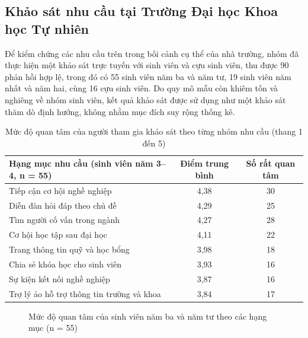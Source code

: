 \documentclass[12pt,a4paper,oneside]{report}
\begin{document}
\subsection{Khảo sát nhu cầu tại Trường Đại học Khoa học Tự nhiên}

Để kiểm chứng các nhu cầu trên trong bối cảnh cụ thể của nhà trường, nhóm đã thực hiện một khảo sát trực tuyến với sinh viên và cựu sinh viên, thu được 90 phản hồi hợp lệ, trong đó có 55 sinh viên năm ba và năm tư, 19 sinh viên năm nhất và năm hai, cùng 16 cựu sinh viên. Do quy mô mẫu còn khiêm tốn và nghiêng về nhóm sinh viên, kết quả khảo sát được sử dụng như một khảo sát thăm dò định hướng, không nhằm mục đích suy rộng thống kê.

\renewcommand{\arraystretch}{1.25}
\begin{table}[H]
\centering
\small
\caption{Mức độ quan tâm của người tham gia khảo sát theo từng nhóm nhu cầu (thang 1 đến 5)}
\label{tab:survey}
\begin{tabular}{|>{\raggedright\arraybackslash}p{7.4cm}|c|c|}
\hline
\textbf{Hạng mục nhu cầu (sinh viên năm 3--4, n = 55)} & \textbf{Điểm trung bình} & \textbf{Số rất quan tâm} \\ \hline
Tiếp cận cơ hội nghề nghiệp & 4,38 & 30 \\ \hline
Diễn đàn hỏi đáp theo chủ đề & 4,29 & 25 \\ \hline
Tìm người cố vấn trong ngành & 4,27 & 28 \\ \hline
Cơ hội học tập sau đại học & 4,11 & 22 \\ \hline
Trang thông tin quỹ và học bổng & 3,98 & 18 \\ \hline
Chia sẻ khóa học cho sinh viên & 3,93 & 16 \\ \hline
Sự kiện kết nối nghề nghiệp & 3,87 & 16 \\ \hline
Trợ lý ảo hỗ trợ thông tin trường và khoa & 3,84 & 17 \\ \hline
\end{tabular}
\end{table}
\renewcommand{\arraystretch}{1}

\begin{figure}[H]\centering
{}
\caption{Mức độ quan tâm của sinh viên năm ba và năm tư theo các hạng mục (n = 55)}
\label{fig:surveychart}
\end{figure}
\end{document}
